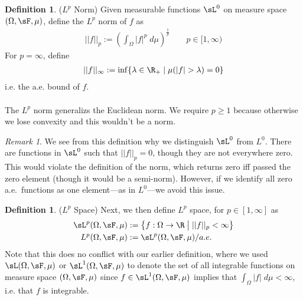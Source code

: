 \documentclass[12pt]{article}
\theoremstyle{plain}
\theoremstyle{definition}
\newtheorem{defn}[thm]{Definition}
\theoremstyle{remark}
\newtheorem*{rmk}{Remark}
\newcommand{\ra}{\rightarrow}
\begin{document}
\begin{defn}($L^p$ Norm)
Given measurable functions $\sL^0$ on measure space
$(\Omega,\sF,\mu)$, define the $L^p$ norm of $f$ as
\begin{align*}
  ||f||_p := \left(\int_\Omega |f|^p\;d\mu\right)^{\frac{1}{p}}
  \qquad p \in [1,\infty)
\end{align*}
For $p=\infty$, define
\begin{align*}
  ||f||_\infty := \inf\{\lambda \in\R_+ \;|\; \mu(|f|>\lambda)=0\}
\end{align*}
i.e. the a.e. bound of $f$.
\\
\\
The $L^p$ norm generalizs the Euclidean norm.
We require $p\geq 1$ because otherwise we lose convexity and this
wouldn't be a norm.
\end{defn}
\begin{rmk}
We see from this definition why we distinguish $\sL^0$ from $L^0$.
There are functions in $\sL^0$ such that $||f||_p = 0$, though they
are not everywhere zero. This would violate the definition of the norm,
which returns zero iff passed the zero element (though it would be a
semi-norm). However, if we identify all zero a.e.\ functions as one
element---as in $L^0$---we avoid this issue.
\end{rmk}

\begin{defn}($L^p$ Space)
Next, we then define $L^p$ space, for $p\in[1,\infty]$ as
\begin{align*}
    \sL^p(\Omega,\sF,\mu)
    &:=\left\{f: \Omega \ra \R \;\big|\; || f||_p < \infty\right\} \\
    L^p(\Omega,\sF,\mu)
    &:= \sL^p(\Omega,\sF,\mu)/a.e.
\end{align*}
Note that this does no conflict with our earlier definition, where we
used $\sL(\Omega,\sF,\mu)$ or $\sL^1(\Omega,\sF,\mu)$ to denote the set
of all integrable functions on measure space $(\Omega,\sF,\mu)$ since
$f\in \sL^1(\Omega,\sF,\mu)$ implies that
$\int_\Omega |f| \; d\mu <\infty$, i.e. that $f$ is integrable.
\end{defn}
\end{document}
